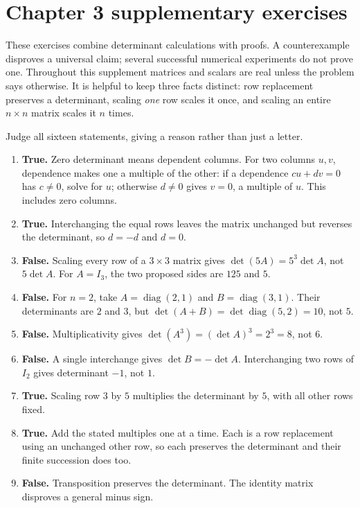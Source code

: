 \section{Chapter 3 supplementary exercises}
These exercises combine determinant calculations with proofs. A counterexample disproves a universal claim; several successful numerical experiments do not prove one. Throughout this supplement matrices and scalars are real unless the problem says otherwise. It is helpful to keep three facts distinct: row replacement preserves a determinant, scaling \emph{one} row scales it once, and scaling an entire $n\times n$ matrix scales it $n$ times.

\goal Judge all sixteen statements, giving a reason rather than just a letter.
\begin{enumerate}[label=(\alph*)]
\item \textbf{True.} Zero determinant means dependent columns. For two columns $u,v$, dependence makes one a multiple of the other: if a dependence $cu+dv=0$ has $c\ne0$, solve for $u$; otherwise $d\ne0$ gives $v=0$, a multiple of $u$. This includes zero columns.
\item \textbf{True.} Interchanging the equal rows leaves the matrix unchanged but reverses the determinant, so $d=-d$ and $d=0$.
\item \textbf{False.} Scaling every row of a $3\times3$ matrix gives $\det(5A)=5^3\det A$, not $5\det A$. For $A=I_3$, the two proposed sides are $125$ and $5$.
\item \textbf{False.} For $n=2$, take $A=\operatorname{diag}(2,1)$ and $B=\operatorname{diag}(3,1)$. Their determinants are $2$ and $3$, but $\det(A+B)=\det\operatorname{diag}(5,2)=10$, not $5$.
\item \textbf{False.} Multiplicativity gives $\det(A^3)=(\det A)^3=2^3=8$, not $6$.
\item \textbf{False.} A single interchange gives $\det B=-\det A$. Interchanging two rows of $I_2$ gives determinant $-1$, not $1$.
\item \textbf{True.} Scaling row 3 by $5$ multiplies the determinant by $5$, with all other rows fixed.
\item \textbf{True.} Add the stated multiples one at a time. Each is a row replacement using an unchanged other row, so each preserves the determinant and their finite succession does too.
\item \textbf{False.} Transposition preserves the determinant. The identity matrix disproves a general minus sign.

\end{enumerate}
